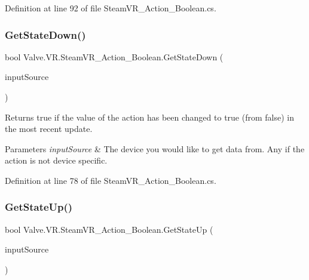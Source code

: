 Definition at line 92 of file Steam\+V\+R\+\_\+\+Action\+\_\+\+Boolean.\+cs.

\mbox{\label{class_valve_1_1_v_r_1_1_steam_v_r___action___boolean_aa0a7eb5f7e02e35fd6922dd30b087f77}} 
\subsubsection{\texorpdfstring{GetStateDown()}{GetStateDown()}}
{\footnotesize\ttfamily bool Valve.\+V\+R.\+Steam\+V\+R\+\_\+\+Action\+\_\+\+Boolean.\+Get\+State\+Down (\begin{DoxyParamCaption}\item[{\mbox{\hyperlink{namespace_valve_1_1_v_r_a82e5bf501cc3aa155444ee3f0662853f}{Steam\+V\+R\+\_\+\+Input\+\_\+\+Sources}}}]{input\+Source }\end{DoxyParamCaption})}



Returns true if the value of the action has been changed to true (from false) in the most recent update. 


\begin{DoxyParams}{Parameters}
{\em input\+Source} & The device you would like to get data from. Any if the action is not device specific.\\
\hline
\end{DoxyParams}


Definition at line 78 of file Steam\+V\+R\+\_\+\+Action\+\_\+\+Boolean.\+cs.

\mbox{\label{class_valve_1_1_v_r_1_1_steam_v_r___action___boolean_a4b582272fb4f9c529e519246332e9922}} 
\subsubsection{\texorpdfstring{GetStateUp()}{GetStateUp()}}
{\footnotesize\ttfamily bool Valve.\+V\+R.\+Steam\+V\+R\+\_\+\+Action\+\_\+\+Boolean.\+Get\+State\+Up (\begin{DoxyParamCaption}\item[{\mbox{\hyperlink{namespace_valve_1_1_v_r_a82e5bf501cc3aa155444ee3f0662853f}{Steam\+V\+R\+\_\+\+Input\+\_\+\+Sources}}}]{input\+Source }\end{DoxyParamCaption})}



